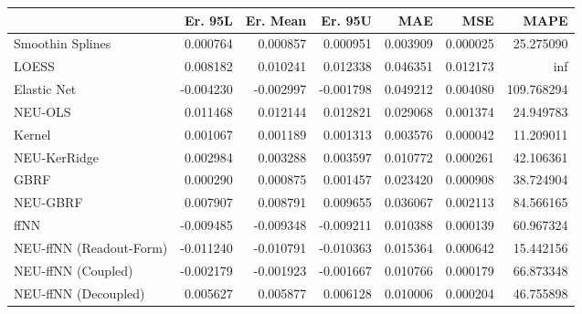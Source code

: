 \begin{tabular}{lrrrrrr}
\toprule
{} &   Er. 95L &  Er. Mean &   Er. 95U &       MAE &       MSE &        MAPE \\
\midrule
Smoothin Splines        &  0.000764 &  0.000857 &  0.000951 &  0.003909 &  0.000025 &   25.275090 \\
LOESS                   &  0.008182 &  0.010241 &  0.012338 &  0.046351 &  0.012173 &         inf \\
Elastic Net             & -0.004230 & -0.002997 & -0.001798 &  0.049212 &  0.004080 &  109.768294 \\
NEU-OLS                 &  0.011468 &  0.012144 &  0.012821 &  0.029068 &  0.001374 &   24.949783 \\
Kernel                  &  0.001067 &  0.001189 &  0.001313 &  0.003576 &  0.000042 &   11.209011 \\
NEU-KerRidge            &  0.002984 &  0.003288 &  0.003597 &  0.010772 &  0.000261 &   42.106361 \\
GBRF                    &  0.000290 &  0.000875 &  0.001457 &  0.023420 &  0.000908 &   38.724904 \\
NEU-GBRF                &  0.007907 &  0.008791 &  0.009655 &  0.036067 &  0.002113 &   84.566165 \\
ffNN                    & -0.009485 & -0.009348 & -0.009211 &  0.010388 &  0.000139 &   60.967324 \\
NEU-ffNN (Readout-Form) & -0.011240 & -0.010791 & -0.010363 &  0.015364 &  0.000642 &   15.442156 \\
NEU-ffNN (Coupled)      & -0.002179 & -0.001923 & -0.001667 &  0.010766 &  0.000179 &   66.873348 \\
NEU-ffNN (Decoupled)    &  0.005627 &  0.005877 &  0.006128 &  0.010006 &  0.000204 &   46.755898 \\
\bottomrule
\end{tabular}
